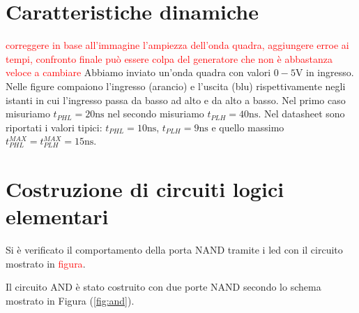 \documentclass[10pt,a4paper]{article}
\begin{document}
	\section{Caratteristiche dinamiche}
\textcolor{red}{correggere in base all'immagine l'ampiezza dell'onda quadra, aggiungere erroe ai tempi, confronto finale può essere colpa del generatore che non è abbastanza veloce a cambiare}
Abbiamo inviato un'onda quadra con valori  $0-5 \si{\volt}$ in ingresso. Nelle figure compaiono l'ingresso (arancio) e l'uscita (blu) rispettivamente negli istanti in cui l'ingresso passa da basso ad alto e da alto a basso.
Nel primo caso misuriamo $t_{PHL}= 20 \si{\nano\second}$ nel secondo  misuriamo $t_{PLH} = 40\si{\nano \second}$.
Nel datasheet sono riportati i valori tipici: $t_{PHL}= 10 \si{\nano\second}$, $t_{PLH} = 9\si{\nano \second}$ e quello massimo $t_{PHL}^{MAX}= t_{PLH}^{MAX}= 15 \si{\nano\second}$.


\section{Costruzione di circuiti logici elementari}
Si è verificato il comportamento della porta NAND tramite i led con il circuito mostrato in \textcolor{red}{figura}.

Il circuito AND è stato costruito con due porte NAND secondo lo schema mostrato in Figura (\ref{fig:and}).
\end{document}

